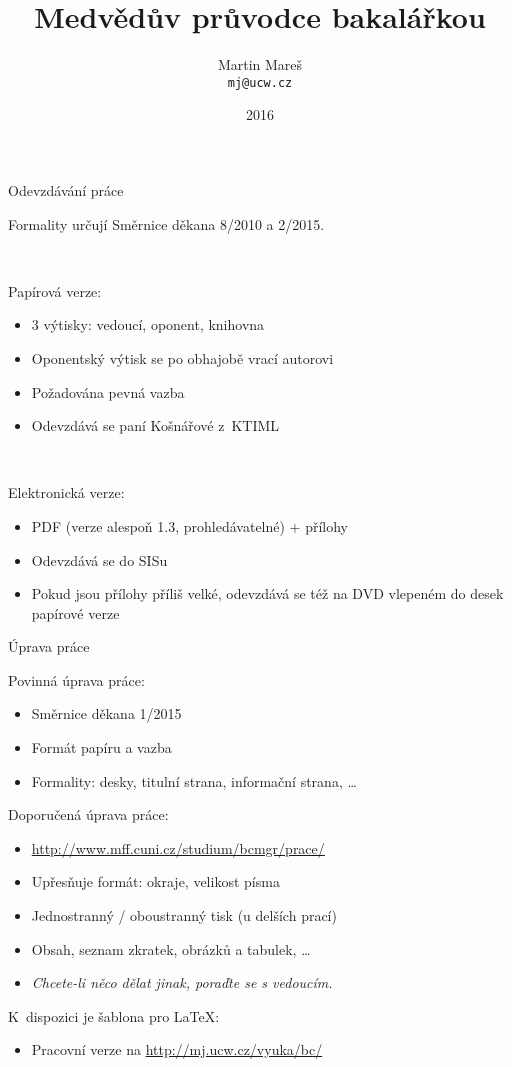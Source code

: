 \documentclass{beamer}
\title[Medvědův průvodce bakalářkou]{Medvědův průvodce bakalářkou}
\author[Martin Mareš]{Martin Mareš\\\texttt{mj@ucw.cz}}
\institute{Katedra Aplikované Matematiky\\MFF UK Praha}
\date{2016}
\begin{document}

\begin{frame}
\titlepage
\end{frame}

\begin{frame}{Odevzdávání práce}

Formality určují Směrnice děkana 8/2010 a 2/2015.

~

Papírová verze:

\begin{itemize}
\item 3 výtisky: vedoucí, oponent, knihovna
\item Oponentský výtisk se po obhajobě vrací autorovi
\item Požadována pevná vazba
\item Odevzdává se paní Košnářové z~KTIML
\end{itemize}

~

Elektronická verze:

\begin{itemize}
\item PDF (verze alespoň 1.3, prohledávatelné) + přílohy
\item Odevzdává se do SISu
\item Pokud jsou přílohy příliš velké, odevzdává se též
      na DVD vlepeném do desek papírové verze
\end{itemize}

\end{frame}

\begin{frame}{Úprava práce}

Povinná úprava práce:

\begin{itemize}
\item Směrnice děkana 1/2015
\item Formát papíru a vazba
\item Formality: desky, titulní strana, informační strana, \dots
\end{itemize}

Doporučená úprava práce:

\begin{itemize}
\item \url{http://www.mff.cuni.cz/studium/bcmgr/prace/}
\item Upřesňuje formát: okraje, velikost písma
\item Jednostranný / oboustranný tisk (u delších prací)
\item Obsah, seznam zkratek, obrázků a tabulek, \dots
\item {\it Chcete-li něco dělat jinak, poraďte se s vedoucím.}
\end{itemize}

K~dispozici je šablona pro \LaTeX:

\begin{itemize}
\item Pracovní verze na \url{http://mj.ucw.cz/vyuka/bc/}
\end{itemize}

\end{frame}
\end{document}
